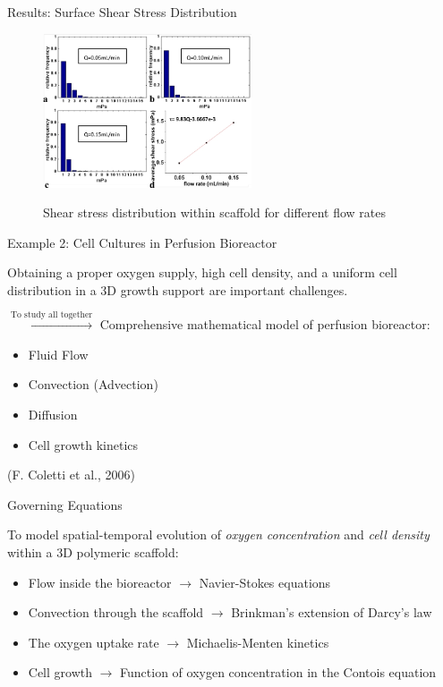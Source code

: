 \documentclass[11pt,t]{beamer}
\begin{document}
\begin{frame}[fragile]{Results: Surface Shear Stress Distribution}  
\vspace{-10pt}
			\begin{figure}
			\centering
			\includegraphics[width=0.55\textwidth]{flow_shear2}
			
			\vspace{5pt}
			\footnotesize  Shear stress distribution within scaffold for different flow rates
			\end{figure}

\end{frame}


\begin{frame}[fragile]{Example 2: Cell Cultures in Perfusion Bioreactor}  

Obtaining a proper oxygen supply, high cell density, and a uniform cell distribution in a 3D growth support are important challenges. 

\vspace{20pt}
$\xrightarrow{\text{To study all together}}$ Comprehensive mathematical model of perfusion bioreactor:
\begin{itemize}
\item
Fluid Flow
\item
Convection (Advection)
\item
Diffusion 
\item
Cell growth kinetics
\end{itemize}
\vfill
\footnotesize(F. Coletti et al., 2006)

\end{frame}

\begin{frame}[fragile]{Governing Equations}  

To model spatial-temporal evolution of \textit{oxygen concentration} and \textit{cell density} within a 3D polymeric scaffold:

\begin{itemize}
\item
Flow inside the bioreactor $\rightarrow$ Navier-Stokes equations
\item
Convection through the scaffold $\rightarrow$ Brinkman’s extension of Darcy’s law
\item
The oxygen uptake rate $\rightarrow$ Michaelis-Menten kinetics
\item
Cell growth $\rightarrow$ Function of oxygen concentration in the Contois equation
\end{itemize}

\end{frame}
\end{document}
